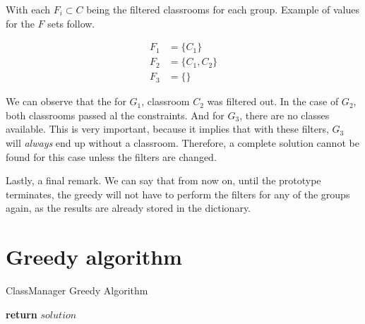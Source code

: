 With each $F_{i} \subset C$ being the filtered classrooms for each group. Example of values for the $F$ sets follow.

\begin{align}
    F_{1} &= \{ C_{1} \}\\
    F_{2} &= \{ C_{1}, C_{2} \}\\
    F_{3} &= \{ \}
\end{align}

We can observe that the for $G_{1}$, classroom $C_{2}$ was filtered out. In the case of $G_{2}$, both classrooms passed al the constraints. And for $G_{3}$, there are no classes available. This is very important, because it implies that with these filters, $G_{3}$ will \textit{always} end up without a classroom. Therefore, a complete solution cannot be found for this case unless the filters are changed.

Lastly, a final remark. We can say that from now on, until the prototype terminates, the greedy will not have to perform the filters for any of the groups again, as the results are already stored in the dictionary. 



\section{Greedy algorithm}

\begin{algorithm}[H]
    \caption{ClassManager Greedy Algorithm}
    \begin{algorithmic}[1]
                    \Else
                    \EndIf
                \EndIf
            \EndFor
            \State \textbf{return} $solution$
        \EndProcedure
    \end{algorithmic}
\end{algorithm}


